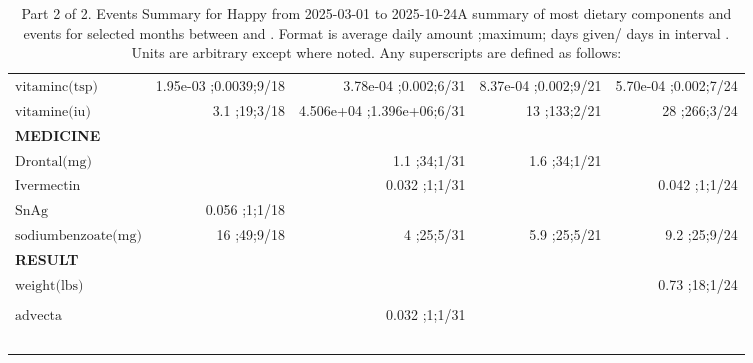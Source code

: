 \begin{table}[H]
\begin{tabular}{|l|r|r|r|r|}
$\textrm{vitaminc(tsp)}$&1.95e-03 ;0.0039;9/18&3.78e-04 ;0.002;6/31&8.37e-04 ;0.002;9/21&5.70e-04 ;0.002;7/24\\
$\textrm{vitamine(iu)}$&3.1 ;19;3/18&4.506e+04 ;1.396e+06;6/31&13 ;133;2/21&28 ;266;3/24\\
{\bf MEDICINE}&&&&\\
$\textrm{Drontal(mg)}$&&1.1 ;34;1/31&1.6 ;34;1/21&\\
$\textrm{Ivermectin}$&&0.032 ;1;1/31&&0.042 ;1;1/24\\
$\textrm{SnAg}$&0.056 ;1;1/18&&&\\
$\textrm{sodiumbenzoate(mg)}$&16 ;49;9/18&4 ;25;5/31&5.9 ;25;5/21&9.2 ;25;9/24\\
{\bf RESULT}&&&&\\
$\textrm{weight(lbs)}$&&&&0.73 ;18;1/24\\
&&&&\\
$\textrm{advecta}$&&0.032 ;1;1/31&&\\
&&&&\\
&&&&\\
&&&&\\
&&&&\\
&&&&\\
\hline
\end{tabular}
\caption{Part 2 of 2.  Events Summary for Happy   from 2025-03-01 to 2025-10-24A summary of most dietary components and events  for selected months between \mjmdateminn and \mjmdatemaxn. Format is average daily amount ;maximum; days given/ days in interval . Units are arbitrary except where noted. Any  superscripts are defined as follows:  \mjmsuperscriptsn}
\end{table}
